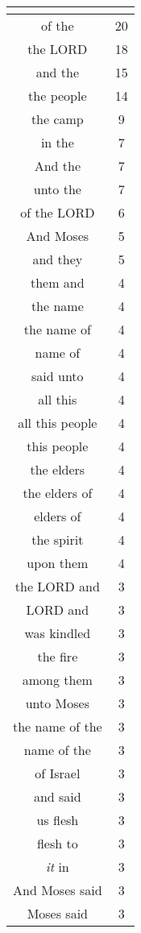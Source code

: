 \begin{center}
\begin{longtable}{|c|c|}
\hline \multicolumn{2}{c}{{ }} \\ \hline
\endfoot 
of the & 20\\ \hline 
the LORD & 18\\ \hline 
and the & 15\\ \hline 
the people & 14\\ \hline 
the camp & 9\\ \hline 
in the & 7\\ \hline 
And the & 7\\ \hline 
unto the & 7\\ \hline 
of the LORD & 6\\ \hline 
And Moses & 5\\ \hline 
and they & 5\\ \hline 
them and & 4\\ \hline 
the name & 4\\ \hline 
the name of & 4\\ \hline 
name of & 4\\ \hline 
said unto & 4\\ \hline 
all this & 4\\ \hline 
all this people & 4\\ \hline 
this people & 4\\ \hline 
the elders & 4\\ \hline 
the elders of & 4\\ \hline 
elders of & 4\\ \hline 
the spirit & 4\\ \hline 
upon them & 4\\ \hline 
the LORD and & 3\\ \hline 
LORD and & 3\\ \hline 
was kindled & 3\\ \hline 
the fire & 3\\ \hline 
among them & 3\\ \hline 
unto Moses & 3\\ \hline 
the name of the & 3\\ \hline 
name of the & 3\\ \hline 
of Israel & 3\\ \hline 
and said & 3\\ \hline 
us flesh & 3\\ \hline 
flesh to & 3\\ \hline 
\emph{it} in & 3\\ \hline 
And Moses said & 3\\ \hline 
Moses said & 3\\ \hline 

\end{longtable}
\end{center}
